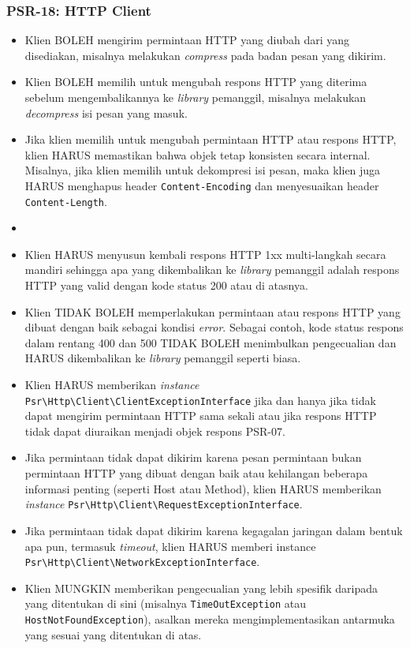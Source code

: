\subsubsection{PSR-18: HTTP Client}
\label{subsubsec:psr18}
\begin{itemize}
	\item Klien BOLEH mengirim permintaan HTTP yang diubah dari yang disediakan, misalnya melakukan \textit{compress} pada badan pesan yang dikirim.
	\item Klien BOLEH memilih untuk mengubah respons HTTP yang diterima sebelum mengembalikannya ke \textit{library} pemanggil, misalnya melakukan \textit{decompress} isi pesan yang masuk. 
	\item Jika klien memilih untuk mengubah permintaan HTTP atau respons HTTP, klien HARUS memastikan bahwa objek tetap konsisten secara internal. Misalnya, jika klien memilih untuk dekompresi isi pesan, maka klien juga HARUS menghapus header \verb|Content-Encoding| dan menyesuaikan header \verb|Content-Length|.
	\item 
	\item Klien HARUS menyusun kembali respons HTTP 1xx multi-langkah secara mandiri sehingga apa yang dikembalikan ke \textit{library} pemanggil adalah respons HTTP yang valid dengan kode status 200 atau di atasnya.
	
	\item Klien TIDAK BOLEH memperlakukan permintaan atau respons HTTP yang dibuat dengan baik sebagai kondisi \textit{error}. Sebagai contoh, kode status respons dalam rentang 400 dan 500 TIDAK BOLEH menimbulkan pengecualian dan HARUS dikembalikan ke \textit{library} pemanggil seperti biasa.
	\item Klien HARUS memberikan \textit{instance} \verb|Psr\Http\Client\ClientExceptionInterface| jika dan hanya jika tidak dapat mengirim permintaan HTTP sama sekali atau jika respons HTTP tidak dapat diuraikan menjadi objek respons PSR-07.
	\item Jika permintaan tidak dapat dikirim karena pesan permintaan bukan permintaan HTTP yang dibuat dengan baik atau kehilangan beberapa informasi penting (seperti Host atau Method), klien HARUS memberikan \textit{instance} \verb|Psr\Http\Client\RequestExceptionInterface|.
	\item Jika permintaan tidak dapat dikirim karena kegagalan jaringan dalam bentuk apa pun, termasuk \textit{timeout}, klien HARUS memberi instance \verb|Psr\Http\Client\NetworkExceptionInterface|.
	\item Klien MUNGKIN memberikan pengecualian yang lebih spesifik daripada yang ditentukan di sini (misalnya \verb|TimeOutException| atau \verb|HostNotFoundException|), asalkan mereka mengimplementasikan antarmuka yang sesuai yang ditentukan di atas.
\end{itemize}


